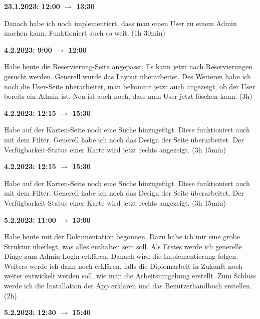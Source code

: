 \vspace{0.5cm}

\textbf{23.1.2023: 12:00 $\rightarrow$ 13:30} \

Danach habe ich noch implementiert, dass man einen User zu einem Admin machen kann. Funktioniert auch so weit. (1h 30min)

\vspace{0.5cm}

\textbf{4.2.2023: 9:00 $\rightarrow$ 12:00} \

Habe heute die Reservierung-Seite angepasst. Es kann jetzt nach Reservierungen gesucht werden. Generell wurde das Layout überarbeitet. Des Weiteren habe ich noch die User-Seite überarbeitet, man bekommt jetzt auch angezeigt, ob der User bereits ein Admin ist. Neu ist auch noch, dass man User jetzt löschen kann. (3h)

\vspace{0.5cm}

\textbf{4.2.2023: 12:15 $\rightarrow$ 15:30} \

Habe auf der Karten-Seite noch eine Suche hinzugefügt. Diese funktioniert auch mit dem Filter. Generell habe ich noch das Design der Seite überarbeitet. Der Verfügbarkeit-Status einer Karte wird jetzt rechts angezeigt. (3h 15min)

\vspace{0.5cm}

\textbf{4.2.2023: 12:15 $\rightarrow$ 15:30} \

Habe auf der Karten-Seite noch eine Suche hinzugefügt. Diese funktioniert auch mit dem Filter. Generell habe ich noch das Design der Seite überarbeitet. Der Verfügbarkeit-Status einer Karte wird jetzt rechts angezeigt. (3h 15min)

\vspace{0.5cm}

\textbf{5.2.2023: 11:00 $\rightarrow$ 13:00} \

Habe heute mit der Dokumentation begonnen. Dazu habe ich mir eine grobe Struktur überlegt, was alles enthalten sein soll. Als Erstes werde ich generelle Dinge zum Admin-Login erklären. Danach wird die Implementierung folgen. Weiters werde ich dann noch erklären, falls die Diplomarbeit in Zukunft noch weiter entwickelt werden soll, wie man die Arbeitsumgebung erstellt. Zum Schluss werde ich die Installation der App erklären und das Benutzerhandbuch erstellen. (2h)

\vspace{0.5cm}

\textbf{5.2.2023: 12:30 $\rightarrow$ 15:40} \

